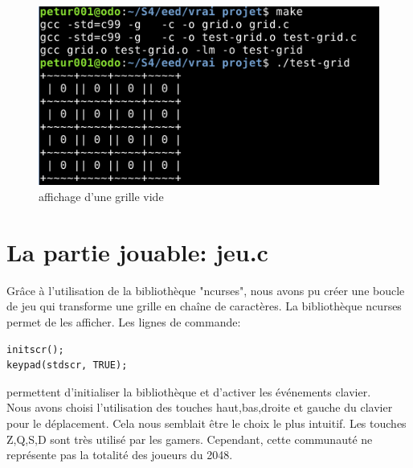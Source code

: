 \documentclass{report}
\begin{document}
\begin{figure}[hbtp]
\caption{affichage d'une grille vide}
\centering
\includegraphics[scale=0.6]{1ergrille.png}
\end{figure}
\section{La partie jouable: jeu.c}
Grâce à l'utilisation de la bibliothèque "ncurses", nous avons pu créer une boucle de jeu qui transforme une grille en chaîne de caractères. La bibliothèque ncurses permet de les afficher. Les lignes de commande:
\begin{lstlisting}[frame=single]
initscr(); 
keypad(stdscr, TRUE);
\end{lstlisting}
permettent d'initialiser la bibliothèque et d'activer les événements clavier.\\
Nous avons choisi l'utilisation des touches haut,bas,droite et gauche du clavier pour le déplacement. Cela nous semblait être le choix le plus intuitif. Les touches Z,Q,S,D sont très utilisé par les gamers. Cependant, cette communauté ne représente pas la totalité des joueurs du 2048.
\end{document}
